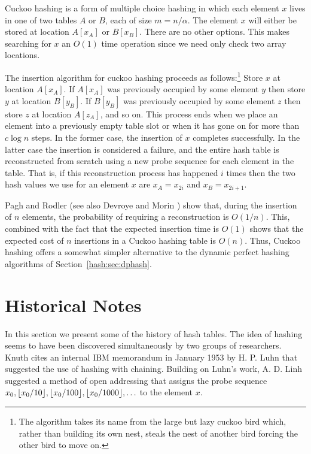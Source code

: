 Cuckoo hashing \cite{pr01} is a form of multiple choice hashing in
which each element $x$ lives in one of two tables $A$ or $B$, each of
size $m=n/\alpha$.  The element $x$ will either be stored at location
$A[x_A]$ or $B[x_B]$. There are no other options.  This makes
searching for $x$ an $O(1)$ time operation since we need only check
two array locations.

The insertion algorithm for cuckoo hashing proceeds as
follows:\footnote{The algorithm takes its name from the large but lazy
cuckoo bird which, rather than building its own nest, steals the nest
of another bird forcing the other bird to move on.} Store $x$ at
location $A[x_A]$. If $A[x_A]$ was previously occupied by some element
$y$ then store $y$ at location $B[y_B]$.  If $B[y_B]$ was previously
occupied by some element $z$ then store $z$ at location $A[z_A]$, and
so on.  This process ends when we place an element into a previously
empty table slot or when it has gone on for more than $c\log n$ steps.
In the former case, the insertion of $x$ completes successfully.  In
the latter case the insertion is considered a failure, and the entire
hash table is reconstructed from scratch using a new probe sequence
for each element in the table.  That is, if this reconstruction
process has happened $i$ times then the two hash values we use for an
element $x$ are $x_A=x_{2i}$ and $x_B=x_{2i+1}$.

Pagh and Rodler \cite{pr01} (see also Devroye and Morin \cite{dm02})
show that, during the insertion of $n$ elements, the probability of
requiring a reconstruction is $O(1/n)$. This, combined with the fact
that the expected insertion time is $O(1)$ shows that the expected
cost of $n$ insertions in a Cuckoo hashing table is $O(n)$.  Thus,
Cuckoo hashing offers a somewhat simpler alternative to the dynamic
perfect hashing algorithms of Section~\ref{hash:sec:dphash}.

\section{Historical Notes}

In this section we present some of the history of hash tables. The
idea of hashing seems to have been discovered simultaneously by two
groups of researchers. Knuth \cite{k97} cites an internal IBM
memorandum in January 1953 by H. P. Luhn that suggested the use of
hashing with chaining.  Building on Luhn's work, A. D. Linh suggested
a method of open addressing that assigns the probe sequence
$x_0,\lfloor x_0/10 \rfloor,\lfloor x_0/100 \rfloor,\lfloor x_0/1000 \rfloor,\ldots$ to the
element $x$.

